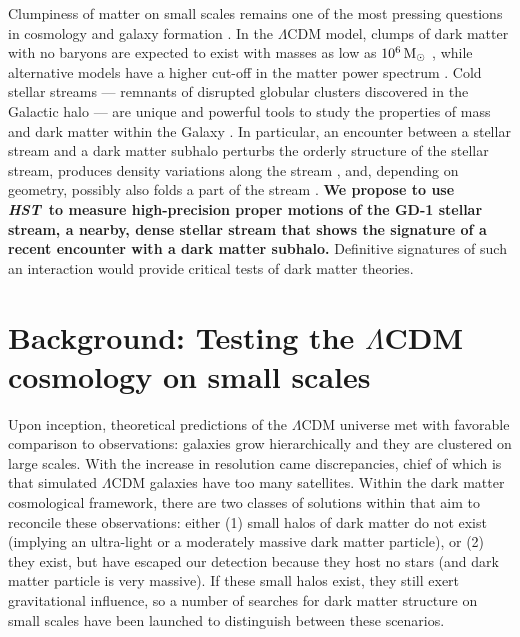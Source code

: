 \documentclass[12pt]{article}
\newcommand{\hst}{\textsl{HST}}
\begin{document}
%
%
\justification          %
\vspace{-0.5cm}

Clumpiness of matter on small scales remains one of the most pressing questions in cosmology and galaxy formation \parencite{bullock2017}.
In the $\Lambda$CDM model, clumps of dark matter with no baryons are expected to exist with masses as low as $10^{6}\rm\,M_\odot$ \parencite{springel2008}, while alternative models have a higher cut-off in the matter power spectrum \parencite[e.g.,][]{bode2001,hu2000}.
Cold stellar streams --- remnants of disrupted globular clusters discovered in the Galactic halo \parencite{gc2016} --- are unique and powerful tools to study the properties of mass and dark matter within the Galaxy \parencite[e.g.,][]{bonaca2018}.
In particular, an encounter between a stellar stream and a dark matter subhalo perturbs the orderly structure of the stellar stream, produces density variations along the stream \parencite[e.g.,][]{carlberg2012}, and, depending on geometry, possibly also folds a part of the stream \parencite[e.g.,][]{yoon2011}.
{\bf We propose to use \hst\ to measure high-precision proper motions of the GD-1 stellar stream, a nearby, dense stellar stream that shows the signature of a recent encounter with a dark matter subhalo.}
Definitive signatures of such an interaction would provide critical tests of dark matter theories.

\section*{Background: Testing the $\Lambda$CDM cosmology on small scales}
Upon inception, theoretical predictions of the $\Lambda$CDM universe met with favorable comparison to observations: galaxies grow hierarchically and they are clustered on large scales.
With the increase in resolution came discrepancies, chief of which is that simulated $\Lambda$CDM galaxies have too many satellites.
Within the dark matter cosmological framework, there are two classes of solutions within that aim to reconcile these observations: either (1) small halos of dark matter do not exist (implying an ultra-light or a moderately massive dark matter particle), or (2) they exist, but have escaped our detection because they host no stars (and dark matter particle is very massive).
If these small halos exist, they still exert gravitational influence, so a number of searches for dark matter structure on small scales have been launched to distinguish between these scenarios.
\end{document}
